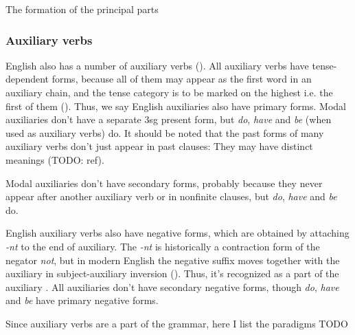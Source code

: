 \documentclass[UTF8, a4paper, oneside, scheme=plain]{ctexrep}
\newcommand*{\citepage}[1]{pp.~{#1}}
\newcommand{\corpus}[1]{\emph{#1}}
\begin{document}
The formation of the principal parts 

\subsubsection{Auxiliary verbs}

English also has a number of auxiliary verbs ().
All auxiliary verbs have tense-dependent forms,
because all of them may appear as the first word in an auxiliary chain,
and the tense category is to be marked on the highest i.e. the first of them ().
Thus, we say English auxiliaries also have primary forms.
Modal auxiliaries don't have a separate 3sg present form,
but \corpus{do}, \corpus{have} and \corpus{be} (when used as auxiliary verbs) do.
It should be noted that the past forms of many auxiliary verbs don't just appear in past clauses:
They may have distinct meanings (TODO: ref).

Modal auxiliaries don't have secondary forms,
probably because they never appear after another auxiliary verb 
or in nonfinite clauses,
but \corpus{do}, \corpus{have} and \corpus{be} do.

English auxiliary verbs also have negative forms,
which are obtained by attaching \corpus{-nt} to the end of auxiliary.
The \corpus{-nt} is historically a contraction form of the negator \corpus{not},
but in modern English the negative suffix moves together with the auxiliary in
subject-auxiliary inversion ().
Thus, it's recognized as a part of the auxiliary \citep[\citepage{91}]{cgel}.
All auxiliaries don't have secondary negative forms,
though \corpus{do}, \corpus{have} and \corpus{be} have primary negative forms.

Since auxiliary verbs are a part of the grammar,
here I list the paradigms TODO
\end{document}
